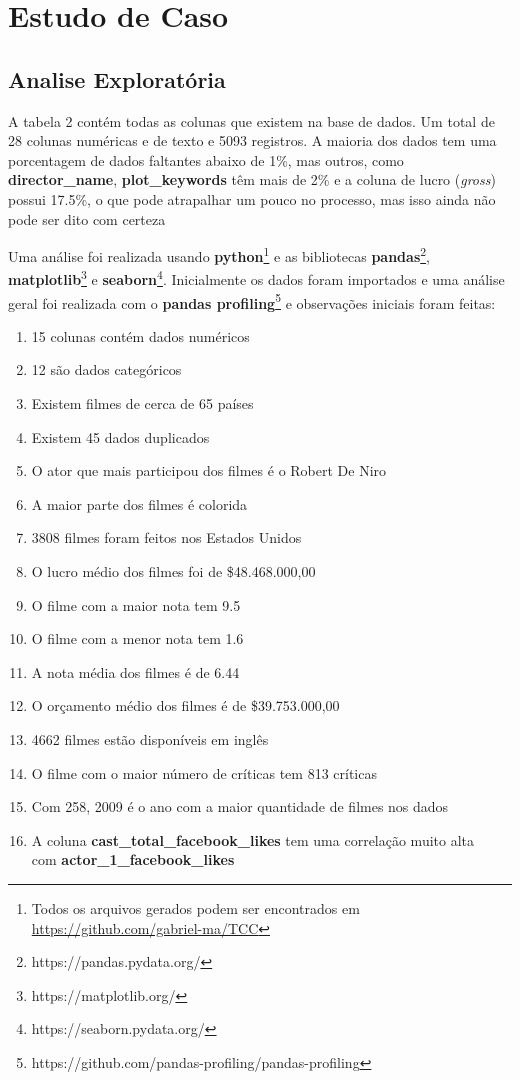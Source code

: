 \section{Estudo de Caso}
\subsection{Analise Exploratória}
A tabela 2 contém todas as colunas que existem na base de dados. Um total de 28 colunas numéricas e de texto e 5093 registros. A maioria dos dados tem uma porcentagem de dados faltantes abaixo de 1\%, mas outros, como \textbf{director\_name}, \textbf{plot\_keywords} têm mais de 2\% e a coluna de lucro (\textit{gross}) possui 17.5\%, o que pode atrapalhar um pouco no processo, mas isso ainda não pode ser dito com certeza


Uma análise foi realizada usando \textbf{python}\footnote{Todos os arquivos gerados podem ser encontrados em \url{https://github.com/gabriel-ma/TCC}} e as bibliotecas \textbf{pandas}\footnote{https://pandas.pydata.org/}, \textbf{matplotlib}\footnote{https://matplotlib.org/} e \textbf{seaborn}\footnote{https://seaborn.pydata.org/}. Inicialmente os dados foram importados e uma análise geral foi realizada com o \textbf{pandas profiling}\footnote{https://github.com/pandas-profiling/pandas-profiling} e observações iniciais foram feitas:
\begin{enumerate}
    \item 15 colunas contém dados numéricos
    \item 12 são dados categóricos
    \item Existem filmes de cerca de 65 países
    \item Existem 45 dados duplicados
    \item O ator que mais participou dos filmes é o Robert De Niro 
    \item A maior parte dos filmes é colorida
    \item 3808  filmes foram feitos nos Estados Unidos
    \item O lucro médio dos filmes foi de \$48.468.000,00
    \item O filme com a maior nota tem 9.5
    \item O filme com a menor nota tem 1.6
    \item A nota média dos filmes é de 6.44
    \item O orçamento médio dos filmes é de \$39.753.000,00
    \item 4662 filmes estão disponíveis em inglês
    \item O filme com o maior número de críticas tem 813 críticas
    \item Com 258, 2009 é o ano com a maior quantidade de filmes nos dados
    \item A coluna \textbf{cast\_total\_facebook\_likes} tem uma correlação muito alta\\ com \textbf{actor\_1\_facebook\_likes}
\end{enumerate}

